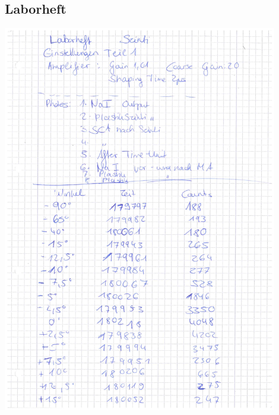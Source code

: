 \documentclass[12pt,listof=totoc]{scrartcl}
\begin{document}
\subsection{Laborheft}\label{laborbuch}
\begin{minipage}{\textwidth}
	\centering
	\includegraphics[width=0.9\textwidth]{figures/Laborheft1.pdf}
\end{minipage}
\newpage
\end{document}
